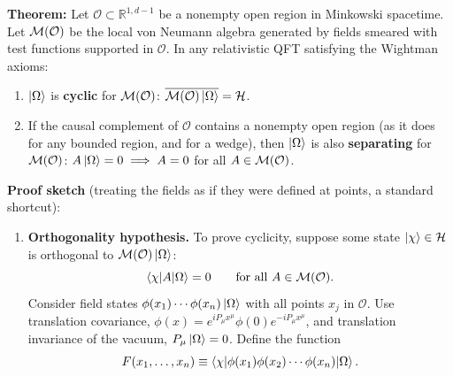 \begin{keyresult}
\textbf{Theorem:} Let $\mathcal{O} \subset \mathbb{R}^{1,d-1}$ be a nonempty open region in Minkowski
spacetime. Let $\mathcal{M}(\mathcal{O})$ be the local von Neumann algebra generated by fields smeared with test
functions supported in $\mathcal{O}$. In any relativistic QFT satisfying the Wightman axioms:
\begin{enumerate}
\item $\ket\Omega$ is \textbf{cyclic} for $\mathcal{M}(\mathcal{O})$: $\overline{\mathcal{M}(\mathcal{O})\ket\Omega} = \mathcal{H}$.
\item If the causal complement of $\mathcal O$ contains a nonempty open region (as it does for any bounded
region, and for a wedge), then $\ket\Omega$ is also \textbf{separating} for $\mathcal{M}(\mathcal{O})$:
$A\ket\Omega = 0 \implies A = 0$ for all $A \in \mathcal{M}(\mathcal{O})$.
\end{enumerate}

\textbf{Proof sketch} (treating the fields as if they were defined at points, a standard shortcut):
\begin{enumerate}[leftmargin=*]
\item \textbf{Orthogonality hypothesis.}
To prove cyclicity, suppose some state $\ket\chi \in \mathcal{H}$ is orthogonal to $\mathcal{M}(\mathcal{O})\ket\Omega$:
\[
\braket{\chi | A | \Omega} = 0 \qquad \text{for all } A \in \mathcal{M}(\mathcal{O}) .
\]
Consider field states $\phi(x_1)\cdots\phi(x_n)\ket\Omega$ with all points $x_j$ in $\mathcal O$. Use
translation covariance, $\phi(x) = e^{i P_\mu x^\mu} \phi(0) e^{-i P_\mu x^\mu}$, and translation invariance of
the vacuum, $P_\mu\ket\Omega = 0$. Define the function
\[
F(x_1, \dots, x_n) \equiv \braket{\chi | \phi(x_1)\phi(x_2)\cdots\phi(x_n)|\Omega} .
\]


\end{enumerate}
\end{keyresult}
